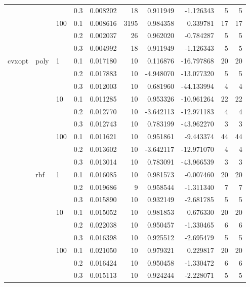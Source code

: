 \begin{table}[H]
\begin{tabular}{llllrrrrrr}
       &     &     & 0.3 &     0.008202 &        18 &  0.911949 &  -1.126343 &           5 &         5 \\
       &     & 100 & 0.1 &     0.008616 &      3195 &  0.984358 &   0.339781 &          17 &        17 \\
       &     &     & 0.2 &     0.002037 &        26 &  0.962020 &  -0.784287 &           5 &         5 \\
       &     &     & 0.3 &     0.004992 &        18 &  0.911949 &  -1.126343 &           5 &         5 \\
cvxopt & poly & 1   & 0.1 &     0.017180 &        10 &  0.116876 & -16.797868 &          20 &        20 \\
       &     &     & 0.2 &     0.017883 &        10 & -4.948070 & -13.077320 &           5 &         5 \\
       &     &     & 0.3 &     0.012003 &        10 &  0.681960 & -44.133994 &           4 &         4 \\
       &     & 10  & 0.1 &     0.011285 &        10 &  0.953326 & -10.961264 &          22 &        22 \\
       &     &     & 0.2 &     0.012770 &        10 & -3.642113 & -12.971183 &           4 &         4 \\
       &     &     & 0.3 &     0.012743 &        10 &  0.783199 & -43.962270 &           3 &         3 \\
       &     & 100 & 0.1 &     0.011621 &        10 &  0.951861 &  -9.443374 &          44 &        44 \\
       &     &     & 0.2 &     0.013602 &        10 & -3.642117 & -12.971070 &           4 &         4 \\
       &     &     & 0.3 &     0.013014 &        10 &  0.783091 & -43.966539 &           3 &         3 \\
       & rbf & 1   & 0.1 &     0.016085 &        10 &  0.981573 &  -0.007460 &          20 &        20 \\
       &     &     & 0.2 &     0.019686 &         9 &  0.958544 &  -1.311340 &           7 &         7 \\
       &     &     & 0.3 &     0.015890 &        10 &  0.932149 &  -2.681785 &           5 &         5 \\
       &     & 10  & 0.1 &     0.015052 &        10 &  0.981853 &   0.676330 &          20 &        20 \\
       &     &     & 0.2 &     0.022038 &        10 &  0.950457 &  -1.330465 &           6 &         6 \\
       &     &     & 0.3 &     0.016398 &        10 &  0.925512 &  -2.695479 &           5 &         5 \\
       &     & 100 & 0.1 &     0.021050 &        10 &  0.979321 &   0.229817 &          20 &        20 \\
       &     &     & 0.2 &     0.016424 &        10 &  0.950458 &  -1.330472 &           6 &         6 \\
       &     &     & 0.3 &     0.015113 &        10 &  0.924244 &  -2.228071 &           5 &         5 \\
\bottomrule
\end{tabular}
\end{table}
